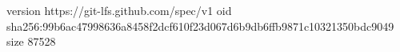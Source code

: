 version https://git-lfs.github.com/spec/v1
oid sha256:99b6ac47998636a8458f2dcf610f23d067d6b9db6ffb9871c10321350bdc9049
size 87528

